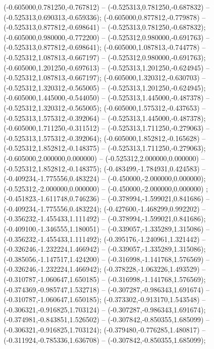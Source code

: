  (-0.605000,0.781250,-0.767812) -- (-0.525313,0.781250,-0.687832) -- (-0.525313,0.690313,-0.659336);
 (-0.605000,0.877812,-0.779878) -- (-0.525313,0.877812,-0.698641) -- (-0.525313,0.781250,-0.687832);
 (-0.605000,0.980000,-0.772200) -- (-0.525312,0.980000,-0.691763) -- (-0.525313,0.877812,-0.698641);
 (-0.605000,1.087813,-0.744778) -- (-0.525312,1.087813,-0.667197) -- (-0.525312,0.980000,-0.691763);
 (-0.605000,1.201250,-0.697613) -- (-0.525313,1.201250,-0.624945) -- (-0.525312,1.087813,-0.667197);
 (-0.605000,1.320312,-0.630703) -- (-0.525312,1.320312,-0.565005) -- (-0.525313,1.201250,-0.624945);
 (-0.605000,1.445000,-0.544050) -- (-0.525313,1.445000,-0.487378) -- (-0.525312,1.320312,-0.565005);
 (-0.605000,1.575312,-0.437653) -- (-0.525313,1.575312,-0.392064) -- (-0.525313,1.445000,-0.487378);
 (-0.605000,1.711250,-0.311512) -- (-0.525313,1.711250,-0.279063) -- (-0.525313,1.575312,-0.392064);
 (-0.605000,1.852812,-0.165628) -- (-0.525312,1.852812,-0.148375) -- (-0.525313,1.711250,-0.279063);
 (-0.605000,2.000000,0.000000) -- (-0.525312,2.000000,0.000000) -- (-0.525312,1.852812,-0.148375);
 (-0.483499,-1.784931,0.424583) -- (-0.409234,-1.775556,0.483224) -- (-0.450000,-2.000000,0.000000);
 (-0.525312,-2.000000,0.000000) -- (-0.450000,-2.000000,0.000000) ;
 (-0.451823,-1.611748,0.746236) -- (-0.378994,-1.599021,0.841686) -- (-0.409234,-1.775556,0.483224);
 (-0.427600,-1.468299,0.992202) -- (-0.356232,-1.455433,1.111492) -- (-0.378994,-1.599021,0.841686);
 (-0.409100,-1.346555,1.180051) -- (-0.339057,-1.335289,1.315086) -- (-0.356232,-1.455433,1.111492);
 (-0.395176,-1.240961,1.321442) -- (-0.326246,-1.232224,1.466942) -- (-0.339057,-1.335289,1.315086);
 (-0.385056,-1.147517,1.424200) -- (-0.316998,-1.141768,1.576569) -- (-0.326246,-1.232224,1.466942);
 (-0.378228,-1.063226,1.493529) -- (-0.310787,-1.060647,1.650185) -- (-0.316998,-1.141768,1.576569);
 (-0.374369,-0.985747,1.532718) -- (-0.307287,-0.986343,1.691674) -- (-0.310787,-1.060647,1.650185);
 (-0.373302,-0.913170,1.543548) -- (-0.306321,-0.916825,1.703124) -- (-0.307287,-0.986343,1.691674);
 (-0.374981,-0.843851,1.526502) -- (-0.307842,-0.850355,1.685099) -- (-0.306321,-0.916825,1.703124);
 (-0.379480,-0.776285,1.480817) -- (-0.311924,-0.785336,1.636708) -- (-0.307842,-0.850355,1.685099);
